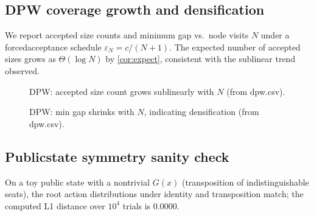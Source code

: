 \subsection{DPW coverage growth and densification}
We report accepted size counts and minimum gap vs.\ node visits $N$ under a forced\textendash acceptance schedule $\varepsilon_N=c/(N+1)$. The expected number of accepted sizes grows as $\Theta(\log N)$ by \cref{cor:expect}, consistent with the sublinear trend observed.

\begin{figure}[t]
\centering
\begin{adjustbox}{width=\linewidth}
\end{adjustbox}
\caption{DPW: accepted size count grows sublinearly with $N$ (from dpw.csv).}
\label{fig:dpw_count}
\end{figure}

\begin{figure}[t]
\centering
\begin{adjustbox}{width=\linewidth}
\end{adjustbox}
\caption{DPW: min gap shrinks with $N$, indicating densification (from dpw.csv).}
\label{fig:dpw_gap}
\end{figure}

\subsection{Public\textendash state symmetry sanity check}
On a toy public state with a nontrivial $G(x)$ (transposition of indistinguishable seats), the root action distributions under identity and transposition match; the computed L1 distance over $10^4$ trials is 0.0000.

